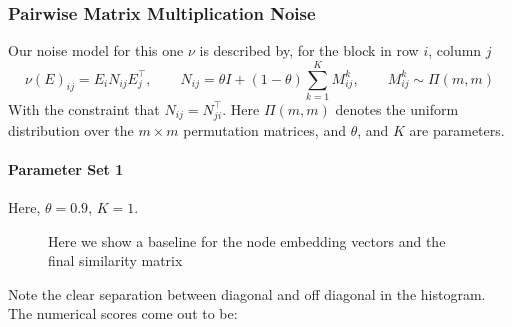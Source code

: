 \documentclass[a4paper]{article}
\begin{document}
\subsubsection*{Pairwise Matrix Multiplication Noise}
Our noise model for this one $\nu$ is described by, for the block in row $i$, column $j$
\begin{equation*}
    \nu(E)_{ij} = E_i N_{ij} E_j^\top, \quad \quad N_{ij} = \theta I + (1-\theta) \sum_{k=1}^K M_{ij}^k , \quad \quad M_{ij}^{k} \sim {\Pi}(m, m)
\end{equation*}
With the constraint that $N_{ij} = N_{ji}^\top$.
Here $\Pi(m,m)$ denotes the uniform distribution over the $m \times m$ permutation matrices, and $\theta$, and $K$ are parameters.

\paragraph{Parameter Set 1}
Here, $\theta = 0.9$, $K = 1$.
\begin{figure}[H]
    \centering
    \caption{Here we show a baseline for the node embedding vectors and the final similarity matrix}
    \label{fig:pairwise_plot}
\end{figure}
Note the clear separation between diagonal and off diagonal in the histogram. The numerical scores come out to be: 
\end{document}
